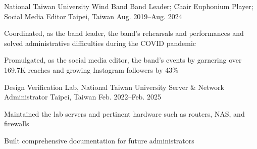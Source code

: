 

\begin{cventries}
    \cventry
        {National Taiwan University Wind Band} %
        {Band Leader; Chair Euphonium Player; Social Media Editor} %
        {Taipei, Taiwan} %
        {Aug. 2019--Aug. 2024} %
        {
          \begin{cvitems} %
            \item Coordinated, as the band leader, the band's rehearsals and performances and solved administrative difficulties during the COVID pandemic
            \item Promulgated, as the social media editor, the band's events by garnering over 169.7K reaches and growing Instagram followers by 43\%
          \end{cvitems}
        }
        
    \cventry
        {Design Verification Lab, National Taiwan University} %
        {Server \& Network Administrator} %
        {Taipei, Taiwan} %
        {Feb. 2022--Feb. 2025} %
        {
          \begin{cvitems} %
            \item Maintained the lab servers and pertinent hardware such as routers, NAS, and firewalls
            \item Built comprehensive documentation for future administrators
          \end{cvitems}
        }

\end{cventries}